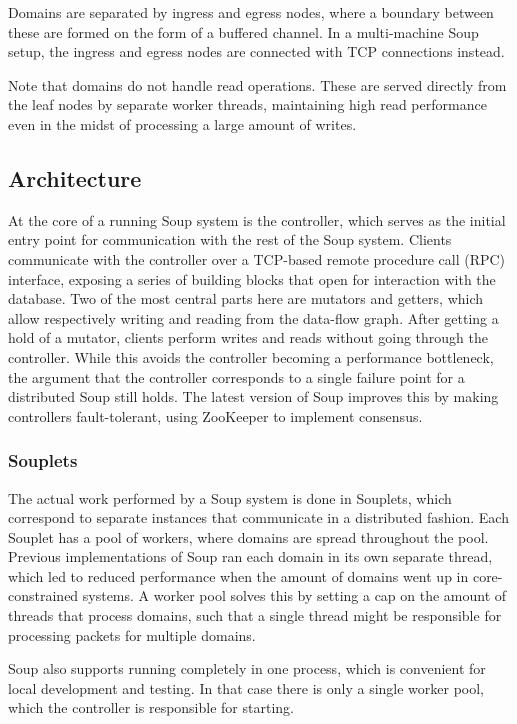 \documentclass[b5paper]{report}
\begin{document}
Domains are separated by ingress and egress nodes, where a boundary between
these are formed on the form of a buffered channel. In a multi-machine Soup
setup, the ingress and egress nodes are connected with TCP connections instead.

Note that domains do not handle read operations. These are served directly from
the leaf nodes by separate worker threads, maintaining high read performance
even in the midst of processing a large amount of writes.

\subsection{Architecture}
At the core of a running Soup system is the controller, which serves as the
initial entry point for communication with the rest of the Soup system. Clients
communicate with the controller over a TCP-based remote procedure call (RPC)
interface, exposing a series of building blocks that open for interaction with
the database. Two of the most central parts here are mutators and getters, which
allow respectively writing and reading from the data-flow graph. After getting a
hold of a mutator, clients perform writes and reads without going through the
controller. While this avoids the controller becoming a performance bottleneck,
the argument that the controller corresponds to a single failure point for a
distributed Soup still holds. The latest version of Soup improves this by making
controllers fault-tolerant, using ZooKeeper \cite{zookeeper} to implement
consensus.

\subsubsection{Souplets}
The actual work performed by a Soup system is done in Souplets, which
correspond to separate instances that communicate in a distributed fashion. Each
Souplet has a pool of workers, where domains are spread throughout the pool.
Previous implementations of Soup ran each domain in its own separate thread,
which led to reduced performance when the amount of domains went up in
core-constrained systems. A worker pool solves this by setting a cap on the
amount of threads that process domains, such that a single thread might be
responsible for processing packets for multiple domains.

Soup also supports running completely in one process, which is convenient for
local development and testing. In that case there is only a single worker pool,
which the controller is responsible for starting.
\end{document}
